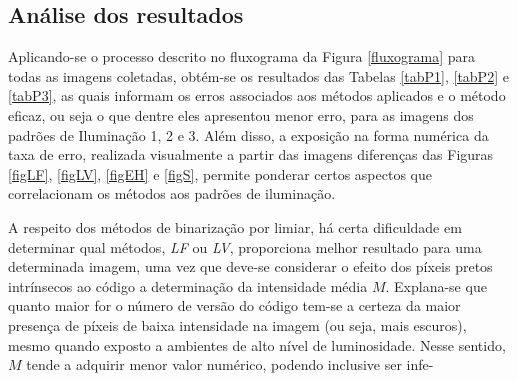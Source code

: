 \documentclass{ceel}
\begin{document}
\begin{multicols}{2}
\begin{minipage}[h]{\columnwidth}
\vspace{-0.1cm}
\caption{Imagens resultantes da Binarização Pós Equalização por Histograma para o QR Code 3 nos padrões de (a) Iluminação 1, (c) Iluminação 2 e (e) Iluminação 3, com suas respectivas imagens diferença em (b), (d) e (f).} \label{figEH}
\end{minipage}

\section{Análise dos resultados} \label{resultados}
Aplicando-se o processo descrito no fluxograma da Figura \ref{fluxograma} para todas as imagens coletadas, obtém-se os resultados das Tabelas \ref{tabP1}, \ref{tabP2} e \ref{tabP3}, as quais informam os erros associados aos métodos aplicados e o método eficaz, ou seja o que dentre eles apresentou menor erro, para as imagens dos padrões de Iluminação 1, 2 e 3. 
Além disso, a exposição na forma numérica da taxa de erro, realizada visualmente a partir das imagens diferenças das Figuras \ref{figLF}, \ref{figLV}, \ref{figEH} e \ref{figS}, permite ponderar certos aspectos que correlacionam os métodos aos padrões de iluminação.

A respeito dos métodos de binarização por limiar, há certa dificuldade em determinar qual métodos, \emph{LF} ou \emph{LV}, proporciona melhor resultado para uma determinada imagem, uma vez que deve-se considerar o efeito dos píxeis pretos intrínsecos ao código a determinação da intensidade média $M$. Explana-se que quanto maior for o número de versão do código tem-se a certeza da maior presença de píxeis de baixa intensidade na imagem (ou seja, mais escuros), mesmo quando exposto a ambientes de alto nível de luminosidade. Nesse sentido, $M$ tende a adquirir menor valor numérico, podendo inclusive ser infe-\\


\end{multicols}
\end{document}
